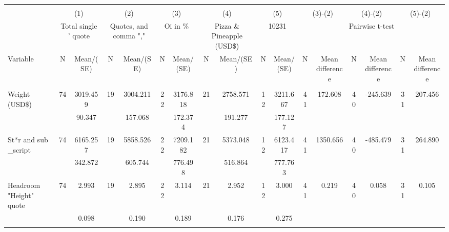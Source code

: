 
\begin{tabular}{@{\extracolsep{5pt}}lcccccccccccccccc}
\\[-1.8ex]\hline \hline \\[-1.8ex]
 & \multicolumn{2}{c}{(1)}  & \multicolumn{2}{c}{(2)}  & \multicolumn{2}{c}{(3)}  & \multicolumn{2}{c}{(4)}  & \multicolumn{2}{c}{(5)}  & \multicolumn{2}{c}{(3)-(2)} & \multicolumn{2}{c}{(4)-(2)} & \multicolumn{2}{c}{(5)-(2)} \\
 & \multicolumn{2}{c}{Total single ' quote}  & \multicolumn{2}{c}{Quotes, and comma ","}  & \multicolumn{2}{c}{Oi in \%}  & \multicolumn{2}{c}{Pizza \& Pineapple (USD\$)}  & \multicolumn{2}{c}{10231}  & \multicolumn{6}{c}{Pairwise t-test}  \\
Variable & N & Mean/(SE) & N & Mean/(SE) & N & Mean/(SE) & N & Mean/(SE) & N & Mean/(SE) & N & Mean difference & N & Mean difference & N & Mean difference \\ \hline \\[-1.8ex] 
Weight (USD\$)   & 74    &  3019.459    & 19    &  3004.211    & 22    &  3176.818    & 21    &  2758.571    & 12    &  3211.667    & 41    &   172.608    & 40    &  -245.639    & 31    &   207.456   \\
 &   &    90.347  &   &   157.068  &   &   172.374  &   &   191.277  &   &   177.127  &   &  &   &  &   &   \\
St*r and sub \_script   & 74    &  6165.257    & 19    &  5858.526    & 22    &  7209.182    & 21    &  5373.048    & 12    &  6123.417    & 41    &  1350.656    & 40    &  -485.479    & 31    &   264.890   \\
 &   &   342.872  &   &   605.744  &   &   776.498  &   &   516.864  &   &   777.763  &   &  &   &  &   &   \\
Headroom "Height" quote   & 74    &     2.993    & 19    &     2.895    & 22    &     3.114    & 21    &     2.952    & 12    &     3.000    & 41    &     0.219    & 40    &     0.058    & 31    &     0.105   \\
 &   &     0.098  &   &     0.190  &   &     0.189  &   &     0.176  &   &     0.275  &   &  &   &  &   &   \\
\hline \\[-1.8ex]

\end{tabular}

